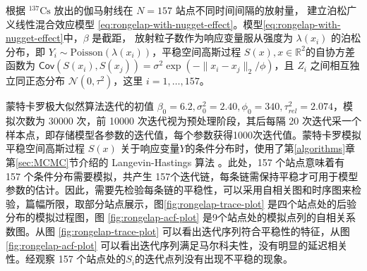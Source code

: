 \documentclass[12pt,a4paper,UTF8,twoside]{book}
\theoremstyle{definition}
\theoremstyle{definition}
\theoremstyle{definition}
\theoremstyle{remark}
\begin{document}
根据 \({}^{137}\mathrm{Cs}\) 放出的伽马射线在 \(N=157\) 站点不同时间间隔的放射量， 建立泊松广义线性混合效应模型 \eqref{eq:rongelap-with-nugget-effect}。模型\eqref{eq:rongelap-with-nugget-effect}中，\(\beta\) 是截距， 放射粒子数作为响应变量服从强度为 \(\lambda(x_i)\) 的泊松分布，即 \(Y_{i} \sim \mathrm{Poisson}( \lambda(x_i) )\)，平稳空间高斯过程 \(S(x),x \in \mathbb{R}^2\)的自协方差函数为 \(\mathsf{Cov}( S(x_i), S(x_j) ) = \sigma^2 \exp( -\|x_i -x_j\|_{2} / \phi )\)，且 \(Z_i\) 之间相互独立同正态分布 \(\mathcal{N}(0,\tau^2)\)，这里 \(i = 1,\ldots, 157\)。

蒙特卡罗极大似然算法迭代的初值 \(\beta_{0} = 6.2,\sigma^2_{0} = 2.40,\phi_{0} = 340,\tau^2_{rel} = 2.074\)，模拟次数为 30000 次，前 10000 次迭代视为预处理阶段，其后每隔 20 次迭代采一个样本点，即存储模型各参数的迭代值，每个参数获得1000次迭代值。蒙特卡罗模拟平稳空间高斯过程 \(S(x)\) 关于响应变量\(Y\)的条件分布时，使用了第\ref{algorithms}章第\ref{sec:MCMC}节介绍的 Langevin-Hastings 算法 \citep{Omiros2003}。此处，157 个站点意味着有 157 个条件分布需要模拟，共产生 157个迭代链，每条链需保持平稳才可用于模型参数的估计。因此，需要先检验每条链的平稳性，可以采用自相关图和时序图来检验，篇幅所限，取部分站点展示，图\ref{fig:rongelap-trace-plot} 是四个站点处的后验分布的模拟过程图，图 \ref{fig:rongelap-acf-plot} 是9个站点处的模拟点列的自相关系数图。从图 \ref{fig:rongelap-trace-plot} 可以看出迭代序列符合平稳性的特征，从图 \ref{fig:rongelap-acf-plot} 可以看出迭代序列满足马尔科夫性，没有明显的延迟相关性。经观察 157 个站点处的\(S_i\)的迭代点列没有出现不平稳的现象。
\end{document}
